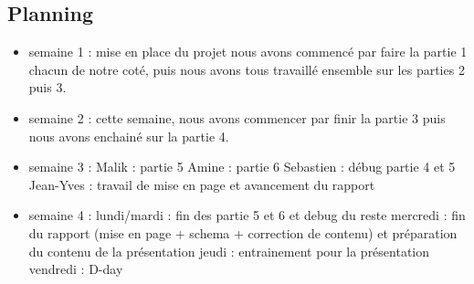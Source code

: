 \documentclass{article}
\begin{document}
	\subsection{Planning}
	\begin{itemize}
		\item semaine 1 :
			\subitem mise en place du projet
			\subitem nous avons commencé par faire la partie 1 chacun de notre coté,
			\subitem puis nous avons tous travaillé ensemble sur les parties 2 puis 3.

		\item semaine 2 :
			\subitem cette semaine, nous avons commencer par finir la partie 3
			\subitem puis nous avons enchainé sur la partie 4.

		\item semaine 3 :
			\subitem Malik : partie 5
			\subitem Amine : partie 6
			\subitem Sebastien : débug partie 4 et 5
			\subitem Jean-Yves : travail de mise en page et avancement du rapport

		\item semaine 4 :
			\subitem lundi/mardi : fin des partie 5 et 6 et debug du reste
			\subitem mercredi : fin du rapport (mise en page + schema + correction de contenu) et préparation du contenu de la présentation
			\subitem jeudi : entrainement pour la présentation
			\subitem vendredi : D-day
	\end{itemize}
\end{document}
